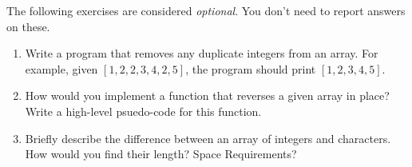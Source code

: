 \documentclass[11pt]{article}
\begin{document}
The following exercises are considered {\it optional}.  You don't need to report answers on these.

\begin{enumerate}[leftmargin=*]

\item Write a program that removes any duplicate integers from an array. For example, given $[1, 2, 2, 3, 4, 2, 5]$, the program should print $[1, 2, 3, 4, 5]$.

\item How would you implement a function that reverses a given array in place? Write a high-level psuedo-code for this function.

%
\item Briefly describe the difference between an array of integers and characters. How would you find their length? Space Requirements?

%

\end{enumerate}

\label{r:lastpage}
\end{document}

